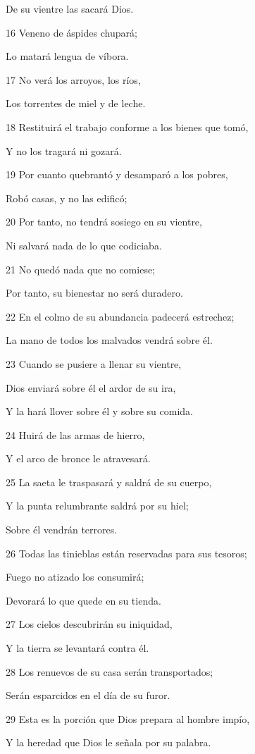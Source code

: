 \par De su vientre las sacará Dios.
\par 16 Veneno de áspides chupará;
\par Lo matará lengua de víbora.
\par 17 No verá los arroyos, los ríos, 
\par Los torrentes de miel y de leche.
\par 18 Restituirá el trabajo conforme a los bienes que tomó,
\par Y no los tragará ni gozará.
\par 19 Por cuanto quebrantó y desamparó a los pobres,
\par Robó casas, y no las edificó;
\par 20 Por tanto, no tendrá sosiego en su vientre,
\par Ni salvará nada de lo que codiciaba. 
\par 21 No quedó nada que no comiese;
\par Por tanto, su bienestar no será duradero. 
\par 22 En el colmo de su abundancia padecerá estrechez;
\par La mano de todos los malvados vendrá sobre él.
\par 23 Cuando se pusiere a llenar su vientre,
\par Dios enviará sobre él el ardor de su ira,
\par Y la hará llover sobre él y sobre su comida.
\par 24 Huirá de las armas de hierro,
\par Y el arco de bronce le atravesará.
\par 25 La saeta le traspasará y saldrá de su cuerpo,
\par Y la punta relumbrante saldrá por su hiel;
\par Sobre él vendrán terrores.
\par 26 Todas las tinieblas están reservadas para sus tesoros;
\par Fuego no atizado los consumirá;
\par Devorará lo que quede en su tienda.
\par 27 Los cielos descubrirán su iniquidad,
\par Y la tierra se levantará contra él.
\par 28 Los renuevos de su casa serán transportados;
\par Serán esparcidos en el día de su furor.
\par 29 Esta es la porción que Dios prepara al hombre impío,
\par Y la heredad que Dios le señala por su palabra.

